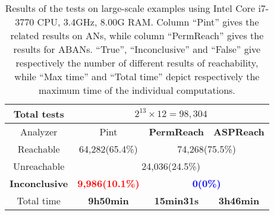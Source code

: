 \documentclass{article}
\theoremstyle{definition}
\begin{document}
\begin{table}[ht]
\begin{tabular}{|c|c|c|c|}
     \hline
     Total tests&\multicolumn{3}{c|}{$2^{13}\times 12=98,304$}\\
     \hline
     Analyzer  &  Pint  &  \textbf{PermReach}   &\textbf{ASPReach}\\
     \hline
     Reachable & 64,282(65.4\%)  & \multicolumn{2}{c|}{74,268(75.5\%)} \\
     \hline
     Unreachable&\multicolumn{3}{c|}{24,036(24.5\%)}\\
     \hline
     \textbf{Inconclusive} &\textcolor{red}{\textbf{9,986(10.1\%)}}&\multicolumn{2}{c|}{\textcolor{blue}{\textbf{0(0\%)}}}   \\
     \hline
     Total time & \textbf{9h50min}      & \textbf{15min31s}         & \textbf{3h46min} \\
     \hline
    \end{tabular}
\caption{Results of the tests on large-scale examples using Intel Core i7-3770 CPU, \@3.4GHz, 8.00G RAM. 
Column ``Pint'' gives the related results on ANs, while column ``PermReach'' gives the results for ABANs. 
``True'', ``Inconclusive'' and ``False'' give respectively the number of different results of reachability, while ``Max time'' and ``Total time'' depict respectively the maximum time of the individual computations.}
\label{tab:2}
\end{table}
\end{document}
